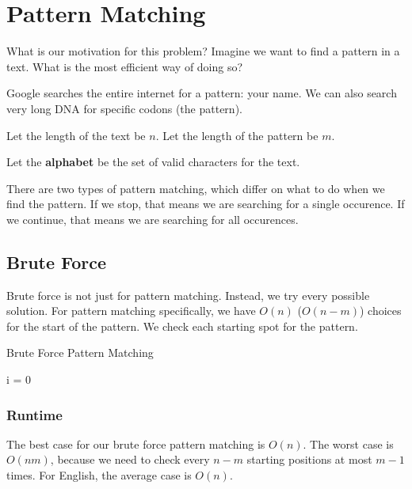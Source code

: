 
\section{Pattern Matching}

What is our motivation for this problem? Imagine we want to find a pattern in a text. What is the most efficient way of doing so?

\begin{eg}
	Google searches the entire internet for a pattern: your name. We can also search very long DNA for specific codons (the pattern).
\end{eg}

\begin{notation}
	Let the length of the text be \( n \). Let the length of the pattern be \( m \).
\end{notation}

\begin{definition}
	Let the \textbf{alphabet} be the set of valid characters for the text.
\end{definition}

There are two types of pattern matching, which differ on what to do when we find the pattern. If we stop, that means we are searching for a single occurence. If we continue, that means we are searching for all occurences.

\subsection{Brute Force}

Brute force is not just for pattern matching. Instead, we try every possible solution. For pattern matching specifically, we have \( O(n) \) (\( O(n-m) \)) choices for the start of the pattern. We check each starting spot for the pattern.


\begin{algorithm}[H]
	\caption{Brute Force Pattern Matching}
	i = 0\;
\end{algorithm}

\subsubsection{Runtime}
The best case for our brute force pattern matching is \( O(n) \). The worst case is \( O(nm) \), because we need to check every \( n-m \) starting positions at most \( m-1 \) times. For English, the average case is \( O(n) \). 

